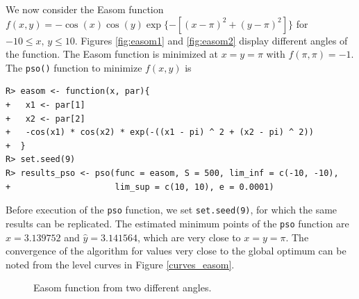 \documentclass[10pt,letterpaper]{article}
\begin{document}
We now consider the Easom function $f(x,y) = -\cos(x)\cos(y)\exp\{-[(x-\pi)^2 + (y-\pi)^2]\}$ for $-10\leq x,\,y \leq 10$.
Figures \ref{fig:easom1} and \ref{fig:easom2} display different angles of the function.
The Easom function is
minimized at $x=y=\pi$ with $f(\pi,\pi)=-1$.
The \texttt{pso()} function to minimize $f(x,y)$ is

\begin{verbatim}
R> easom <- function(x, par){
+   x1 <- par[1]
+   x2 <- par[2]
+   -cos(x1) * cos(x2) * exp(-((x1 - pi) ^ 2 + (x2 - pi) ^ 2))
+  }
R> set.seed(9)
R> results_pso <- pso(func = easom, S = 500, lim_inf = c(-10, -10),
+                     lim_sup = c(10, 10), e = 0.0001)
\end{verbatim}

Before execution of the \texttt{pso} function, we set \texttt{set.seed(9)}, for which the same results can be replicated.
The estimated minimum points of the \texttt{pso} function are $\widehat{x} = 3.139752$ and $\widehat{y} = 3.141564$, which are very close to $x=y=\pi$.
The convergence of the algorithm for  values very close to the global optimum can be noted from the level curves  in Figure \ref{curves_easom}.

\begin{figure}[H]
\centering
\subfigure{
	\label{fig:easom1}
}
\subfigure{
	\label{fig:easom2}
}
\caption{Easom function from two different angles.}
\label{fig:easom}
\end{figure}
\end{document}
